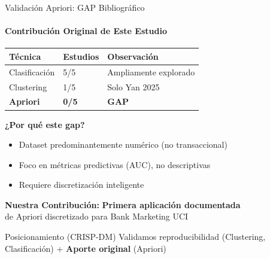 \documentclass[10pt]{beamer}
\begin{document}
\begin{frame}{Validación Apriori: GAP Bibliográfico}
\framesubtitle{Contribución Original de Este Estudio}

\begin{table}
\centering
\small
\begin{tabular}{lll}
\toprule
\textbf{Técnica} & \textbf{Estudios} & \textbf{Observación} \\
\midrule
Clasificación & 5/5 & Ampliamente explorado \\
Clustering & 1/5 & Solo Yan 2025 \\
\textcolor{mRed}{\textbf{Apriori}} & \textcolor{mRed}{\textbf{0/5}} & \textcolor{mRed}{\textbf{GAP}} \\
\bottomrule
\end{tabular}
\end{table}

\textbf{¿Por qué este gap?}
\begin{itemize}
    \item Dataset predominantemente numérico (no transaccional)
    \item Foco en métricas predictivas (AUC), no descriptivas
    \item Requiere discretización inteligente
\end{itemize}

\vspace{0.2cm}
\textbf{Nuestra Contribución:} \textcolor{mGreen}{\textbf{Primera aplicación documentada}}\\
de Apriori discretizado para Bank Marketing UCI

\vspace{0.1cm}
\begin{alertblock}{Posicionamiento (CRISP-DM)}
\small
Validamos reproducibilidad (Clustering, Clasificación) + \textbf{Aporte original} (Apriori)
\end{alertblock}
\end{frame}
\end{document}
